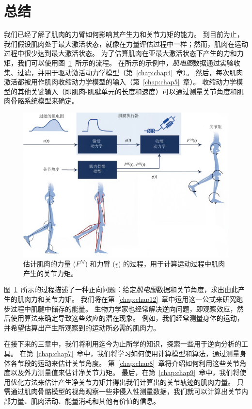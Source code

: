 \section{总结}

我们已经了解了肌肉的力臂如何影响其产生力和关节力矩的能力。
到目前为止，我们假设肌肉处于最大激活状态，就像在力量评估过程中一样；然而，肌肉在运动过程中很少达到最大激活状态。
为了估算肌肉在亚最大激活状态下产生的力和力矩，我们可以使用图~\ref{fig:6_17}~所示的流程。
在所示的示例中，\textit{肌电图}数据通过实验收集、过滤，并用于驱动激活动力学模型（第~\ref{chap:chap4}~章）。
然后，每次肌肉激活都被用作肌肉收缩动力学模型的输入（第~\ref{chap:chap5}~章）。
收缩动力学模型的其他关键输入（即肌肉-肌腱单元的长度和速度）可以通过测量关节角度和肌肉骨骼系统模型来确定。


\begin{figure}[!htb]
	\centering
	\includegraphics[width=1.0\linewidth]{chap6/6_17}
	\caption{估计肌肉的力量 ($F^M$) 和力臂 ($\underline{r}$) 的过程，用于计算运动过程中肌肉产生的关节力矩。 \label{fig:6_17}}
\end{figure}


图~\ref{fig:6_17}~所示的过程描述了一种正向问题：给定\textit{肌电图}数据和关节角度，求出由此产生的肌肉力和关节力矩。
我们将在第~\ref{chap:chap12}~章中运用这一公式来研究跑步过程中肌腱中储存的能量。
生物力学家也经常解决逆向问题，即观察效应，然后使用算法来确定导致这些效应的潜在现象。
例如，我们经常测量身体的运动，并希望估算出产生所观察到的运动所必需的肌肉力。


在接下来的三章中，我们将利用迄今为止所学的知识，探索一些用于逆向分析的工具。
在第~\ref{chap:chap7}~章中，我们将学习如何使用计算模型和算法，通过测量身体各节段的运动来估计关节角度。
第~\ref{chap:chap8}~章将介绍如何利用这些关节角度以及外力测量值来估计净关节力矩。
最后，在第~\ref{chap:chap9}~章中，我们将使用优化方法来估计产生净关节力矩并得出我们计算出的关节轨迹的肌肉力量。
只需通过肌肉骨骼模型的视角观察一些非侵入性测量数据，我们就可以计算出关节内部力量、肌肉活动、能量消耗和其他有价值的信息。




